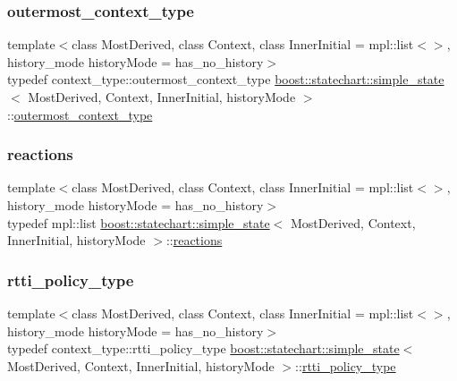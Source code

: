 \subsubsection{\texorpdfstring{outermost\+\_\+context\+\_\+type}{outermost\_context\_type}}
{\footnotesize\ttfamily template$<$class Most\+Derived, class Context, class Inner\+Initial = mpl\+::list$<$$>$, history\+\_\+mode history\+Mode = has\+\_\+no\+\_\+history$>$ \\
typedef context\+\_\+type\+::outermost\+\_\+context\+\_\+type \mbox{\hyperlink{classboost_1_1statechart_1_1simple__state}{boost\+::statechart\+::simple\+\_\+state}}$<$ Most\+Derived, Context, Inner\+Initial, history\+Mode $>$\+::\mbox{\hyperlink{classboost_1_1statechart_1_1simple__state_a25f32527ab9e99c9ae75c723e4be9cb6}{outermost\+\_\+context\+\_\+type}}}

\mbox{\label{classboost_1_1statechart_1_1simple__state_ad6e7750fede08000c7cf827dba68a85d}} 
\subsubsection{\texorpdfstring{reactions}{reactions}}
{\footnotesize\ttfamily template$<$class Most\+Derived, class Context, class Inner\+Initial = mpl\+::list$<$$>$, history\+\_\+mode history\+Mode = has\+\_\+no\+\_\+history$>$ \\
typedef mpl\+::list \mbox{\hyperlink{classboost_1_1statechart_1_1simple__state}{boost\+::statechart\+::simple\+\_\+state}}$<$ Most\+Derived, Context, Inner\+Initial, history\+Mode $>$\+::\mbox{\hyperlink{classboost_1_1statechart_1_1simple__state_ad6e7750fede08000c7cf827dba68a85d}{reactions}}}

\mbox{\label{classboost_1_1statechart_1_1simple__state_a13264629f55d891a2f7e5ca247264216}} 
\subsubsection{\texorpdfstring{rtti\+\_\+policy\+\_\+type}{rtti\_policy\_type}}
{\footnotesize\ttfamily template$<$class Most\+Derived, class Context, class Inner\+Initial = mpl\+::list$<$$>$, history\+\_\+mode history\+Mode = has\+\_\+no\+\_\+history$>$ \\
typedef context\+\_\+type\+::rtti\+\_\+policy\+\_\+type \mbox{\hyperlink{classboost_1_1statechart_1_1simple__state}{boost\+::statechart\+::simple\+\_\+state}}$<$ Most\+Derived, Context, Inner\+Initial, history\+Mode $>$\+::\mbox{\hyperlink{classboost_1_1statechart_1_1simple__state_a13264629f55d891a2f7e5ca247264216}{rtti\+\_\+policy\+\_\+type}}}

